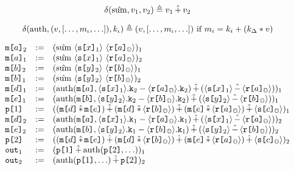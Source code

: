$$
\delta(\hat{\mathrm{sum}},v_1,v_2) \triangleq v_1 \,\hat{+}\, v_2
$$

$$
\delta(\mathrm{auth}, (v, [\ldots,m_\iota,\ldots]), k_\iota) \triangleq
     (v, [\ldots,m_\iota,\ldots]) \text{\ if\ } m_i = k_i + (k_\Delta * v)
$$

$$
\begin{array}{lcl}
  \elab{\mesg{a}}{2} &:=&
  \elab{(\macotp\ \macv{\elab{\secret{x}}{1}}\ \macv{\elab{\flip{a}}{\Oracle}})}{1}\\
  \elab{\mesg{a}}{1} &:=&
  \elab{(\macotp\ \macv{\elab{\secret{x}}{1}}\ \macv{\elab{\flip{a}}{\Oracle}})}{2}\\
  \elab{\mesg{b}}{2} &:=&
  \elab{(\macotp\ \macv{\elab{\secret{y}}{2}}\ \macv{\elab{\flip{b}}{\Oracle}})}{1}\\
  \elab{\mesg{b}}{1} &:=&
  \elab{(\macotp\ \macv{\elab{\secret{y}}{2}}\ \macv{\elab{\flip{b}}{\Oracle}})}{2}\\
  \elab{\mesg{d}}{1} &:=&
  \elab{(\macauth(\mesg{a}, \mack{\elab{\secret{x}}{1}}{2} \fminus \mack{\elab{\flip{a}}{\Oracle}}{2}) \macplus (\macv{\elab{\secret{x}}{1}}\macminus\macv{\elab{\flip{a}}{\Oracle}}))}{1}\\
  \elab{\mesg{e}}{1}&:=&
  \elab{(\macauth(\mesg{b}, \mack{\elab{\secret{y}}{2}}{2} \fminus \mack{\elab{\flip{b}}{\Oracle}}{2}) \macplus (\macv{\elab{\secret{y}}{2}}\macminus\macv{\elab{\flip{b}}{\Oracle}}))}{1}\\
  \rvl{1} &:=&
  \elab{( (\mesg{d} \mactimes \mesg{e}) \macplus
          (\mesg{d} \mactimes \macv{\elab{\flip{b}}{\Oracle}}) \macplus
          (\mesg{e} \mactimes \macv{\elab{\flip{a}}{\Oracle}}) \macplus \macv{\elab{\secret{c}}{\Oracle}}
    )}{1}\\
  \elab{\mesg{d}}{2} &:=&
  \elab{(\macauth(\mesg{a}, \mack{\elab{\secret{x}}{1}}{1} \fminus \mack{\elab{\flip{a}}{\Oracle}}{1}) \macplus (\macv{\elab{\secret{x}}{1}}\macminus\macv{\elab{\flip{a}}{\Oracle}}))}{2}\\
  \elab{\mesg{e}}{2}&:=&
  \elab{(\macauth(\mesg{b}, \mack{\elab{\secret{y}}{2}}{1} \fminus \mack{\elab{\flip{b}}{\Oracle}}{1}) \macplus (\macv{\elab{\secret{y}}{2}}\macminus\macv{\elab{\flip{b}}{\Oracle}}))}{2}\\
  \rvl{2} &:=&
  \elab{( (\mesg{d} \mactimes \mesg{e}) \macplus
          (\mesg{d} \mactimes \macv{\elab{\flip{b}}{\Oracle}}) \macplus
          (\mesg{e} \mactimes \macv{\elab{\flip{a}}{\Oracle}}) \macplus \macv{\elab{\secret{c}}{\Oracle}}
    )}{2}\\
  \out{1} &:=& \elab{(\rvl{1} \macplus \macauth(\rvl{2},\ldots))}{1} \\
  \out{2} &:=& \elab{(\macauth(\rvl{1},\ldots) \macplus \rvl{2})}{2}
\end{array}
$$


